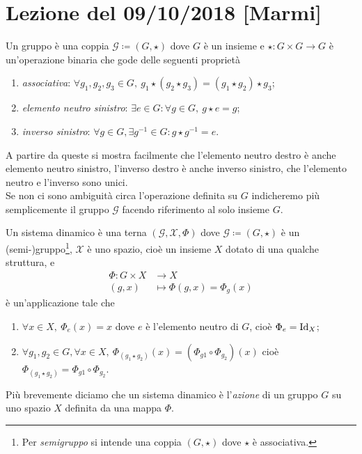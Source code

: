 \section{Lezione del 09/10/2018 [Marmi]}
\begin{definition}[gruppo]
	Un gruppo è una coppia $ \mathcal{G} \coloneqq (G, \star) $ dove $ G $ è un insieme e $ {\star \colon G \times G \to G} $ è un'operazione binaria che gode delle seguenti proprietà
	\begin{enumerate}[label=(\roman*)]
		\item \emph{associativa}: $ \forall g_1, g_2, g_3 \in G, \ g_1 \star (g_2 \star g_3) = (g_1 \star g_2) \star g_3 $;
		\item \emph{elemento neutro sinistro}: $  \exists e \in G : \forall g \in G, \ g \star e = g $;
		\item \emph{inverso sinistro}: $ \forall g \in G, \exists g^{-1} \in G : g \star g^{-1} = e $.
	\end{enumerate}
	A partire da queste si mostra facilmente che l'elemento neutro destro è anche elemento neutro sinistro, l'inverso destro è anche inverso sinistro, che l'elemento neutro e l'inverso sono unici. \\
	Se non ci sono ambiguità circa l'operazione definita su $ G $ indicheremo più semplicemente il gruppo $ \mathcal{G} $ facendo riferimento al solo insieme $ G $. 
\end{definition}

\begin{definition} \label{def:sistema-dinamico}
	Un sistema dinamico è una terna $ (\mathcal{G}, \mathcal{X}, \Phi) $ dove $ {\mathcal{G} \coloneqq (G, \star)} $ è un (semi-)gruppo\footnote{Per \emph{semigruppo} si intende una coppia $ (G,\star) $ dove $ \star $ è associativa.}, $ \mathcal{X} $ è uno spazio, cioè un insieme $ X $ dotato di una qualche struttura, e 
	\begin{align*}
		\Phi \colon G \times X & \to X \\
		(g, x) & \mapsto \Phi(g, x) = \Phi_g(x)
	\end{align*}
	è un'applicazione tale che
	\begin{enumerate}[label=(\roman*)]
		\item $ \forall x \in X, \ \Phi_e(x) = x $ dove $ e $ è l'elemento neutro di $ G $, cioè $ \Phi_e = \mathrm{Id}_X $;
		\item $ \forall g_1, g_2 \in G, \forall x \in X, \ \Phi_{(g_1 \star g_2)}(x) = (\Phi_{g1} \circ \Phi_{g_2})(x) $ cioè $ \Phi_{(g_1 \star g_2)} = \Phi_{g1} \circ \Phi_{g_2} $.
	\end{enumerate}
	Più brevemente diciamo che un sistema dinamico è l'\emph{azione} di un gruppo $ G $ su uno spazio $ X $ definita da una mappa $ \Phi $. 
\end{definition}

